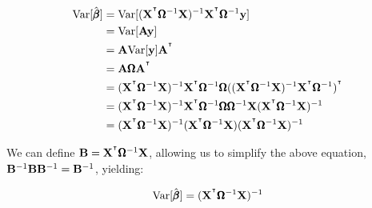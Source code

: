 \documentclass[12pt]{article}
\begin{document}
\begin{align*}
    \Var[ \hat{\bbeta} ] &= \Var[(\bX^{\T} \bOmega^{-1} \bX)^{-1} \bX^{\T} \bOmega^{-1} \by] \\
    &= \Var[\bA \by] \\
    &= \bA \Var[\by] \bA^{\T} \\
    &= \bA \bOmega \bA^{\T} \\
    &= (\bX^{\T} \bOmega^{-1} \bX)^{-1} \bX^{\T} \bOmega^{-1} \bOmega ((\bX^{\T} \bOmega^{-1} \bX)^{-1} \bX^{\T} \bOmega^{-1})^{\T} \\
    &= (\bX^{\T} \bOmega^{-1} \bX)^{-1} \bX^{\T} \bOmega^{-1} \bOmega \bOmega^{-1} \bX (\bX^{\T} \bOmega^{-1} \bX)^{-1} \\
    &= (\bX^{\T} \bOmega^{-1} \bX)^{-1} (\bX^{\T} \bOmega^{-1} \bX) (\bX^{\T} \bOmega^{-1} \bX)^{-1}
\end{align*}

We can define $\bB = \bX^{\T} \bOmega^{-1} \bX$, allowing us to simplify the above equation, $\bB^{-1} \bB \bB^{-1} = \bB^{-1}$, yielding:

$$ \Var[ \hat{\bbeta} ] = (\bX^{\T} \bOmega^{-1} \bX)^{-1} $$
\end{document}
